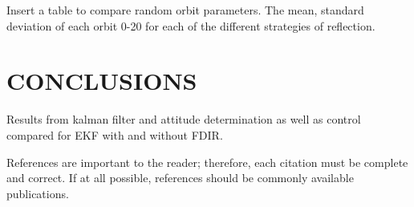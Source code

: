 \documentclass[letterpaper, 10 pt, conference]{ieeeconf}  %
\begin{document}
\newpage

Insert a table to compare random orbit parameters. The mean, standard deviation of each orbit 0-20 for each of the different strategies of reflection.

\section{CONCLUSIONS}
Results from kalman filter and attitude determination as well as control compared for EKF with and without FDIR.

\addtolength{\textheight}{-12cm}   %





References are important to the reader; therefore, each citation must be complete and correct. If at all possible, references should be commonly available publications.



\printbibliography[heading=bibintoc]




\end{document}

